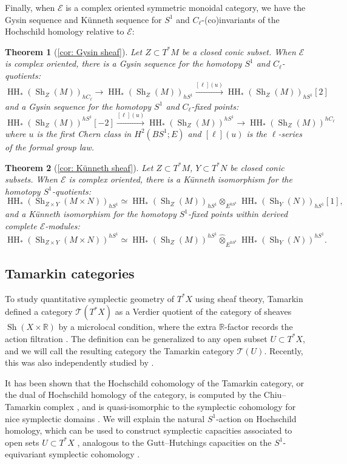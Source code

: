 \documentclass[11pt]{amsart}
\numberwithin{equation}{section}
\theoremstyle{plain}
\newtheorem{Thm}{Theorem}[section]
\theoremstyle{definition}
\theoremstyle{remark}
\newcommand{\bR} { {\mathbb{R}}}
\newcommand{\cE} { {\mathcal{E}}}
\newcommand{\sT} { {\mathscr{T}}}
\newcommand{\Sh} { {\operatorname{Sh}}}
\newcommand\HH{\operatorname{HH}}
\begin{document}
Finally, when $\cE$ is a complex oriented symmetric monoidal category, we have the Gysin sequence and K\"unneth sequence for $S^1$ and $C_\ell$-(co)invariants of the Hochschild homology relative to $\cE$:

\begin{Thm}[\autoref{cor: Gysin sheaf}]
    Let $Z \subset T^*M$ be a closed conic subset. When $\cE$ is complex oriented, there is a Gysin sequence for the homotopy $S^1$ and $C_\ell$-quotients:
    \[\HH_*(\Sh_Z(M))_{hC_\ell} \to \HH_*(\Sh_Z(M))_{hS^1} \xrightarrow{[\ell](u)} \HH_*(\Sh_Z(M))_{hS^1}[2]\]
    and a Gysin sequence for the homotopy $S^1$ and $C_\ell$-fixed points:
    \[\HH_*(\Sh_Z(M))^{hS^1}[-2] \xrightarrow{[\ell](u)} \HH_*(\Sh_Z(M))^{hS^1} \to \HH_*(\Sh_Z(M))^{hC_\ell}\]
    where $u$ is the first Chern class in $H^2(BS^1; E)$ and $[\ell](u)$ is the $\ell$-series of the formal group law.
\end{Thm}

\begin{Thm}[\autoref{cor: Künneth sheaf}]
    Let $Z \subset T^*M$, $Y \subset T^*N$ be closed conic subsets. When $\cE$ is complex oriented, there is a K\"unneth isomorphism for the homotopy $S^1$-quotients:
    \[\HH_*(\Sh_{Z\times Y}(M \times N))_{hS^1} \simeq \HH_*(\Sh_Z(M))_{hS^1} \otimes _{E^{hS^1}} \HH_*(\Sh_Y(N))_{hS^1}[1],\]
    and a K\"unneth isomorphism for the homotopy $S^1$-fixed points within derived complete $\cE$-modules:
    \[\HH_*(\Sh_{Z\times Y}(M \times N))^{hS^1} \simeq \HH_*(\Sh_Z(M))^{hS^1} \widehat\otimes _{E^{hS^1}} \HH_*(\Sh_Y(N))^{hS^1}.\]
\end{Thm}

\subsection{Tamarkin categories}
To study quantitative symplectic geometry of $T^*X$ using sheaf theory, Tamarkin defined a category $\sT(T^*X)$ as a Verdier quotient of the category of sheaves $\Sh(X\times \bR)$ by a microlocal condition, where the extra $\bR$-factor records the action filtration \cite{tamarkin2013}. The definition can be generalized to any open subset $U \subset T^*X$, and we will call the resulting category the Tamarkin category $\sT(U)$. Recently, this was also independently studied by \cite{Scholze-betti}.

It has been shown that the Hochschild cohomology of the Tamarkin category, or the dual of Hochschild homology of the category, is computed by the Chiu--Tamarkin complex \cite{chiu2017,zhang2020quantitative,CyclicZHANG}, and is quasi-isomorphic to the symplectic cohomology for nice symplectic domains \cite{Hochschild-Kuo-Shende-Zhang}. We will explain the natural $S^1$-action on Hochschild homology, which can be used to construct symplectic capacities associated to open sets $U \subset T^*X$ \cite{zhang2020quantitative,CyclicZHANG}, analogous to the Gutt--Hutchings capacities on the $S^1$-equivariant symplectic cohomology \cite{gutthutchings2018capacities}.
\end{document}
